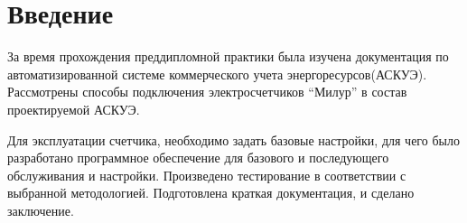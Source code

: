 \setcounter{figure}{0}
\newpage
\section*{Введение}

За время прохождения преддипломной практики была изучена документация по автоматизированной системе коммерческого учета энергоресурсов(АСКУЭ). Рассмотрены способы подключения электросчетчиков ``Милур'' в состав проектируемой АСКУЭ. 

Для эксплуатации счетчика, необходимо задать базовые настройки, для чего было разработано программное обеспечение для базового и последующего обслуживания и настройки. Произведено тестирование в соответствии с выбранной методологией. Подготовлена краткая документация, и сделано заключение.

